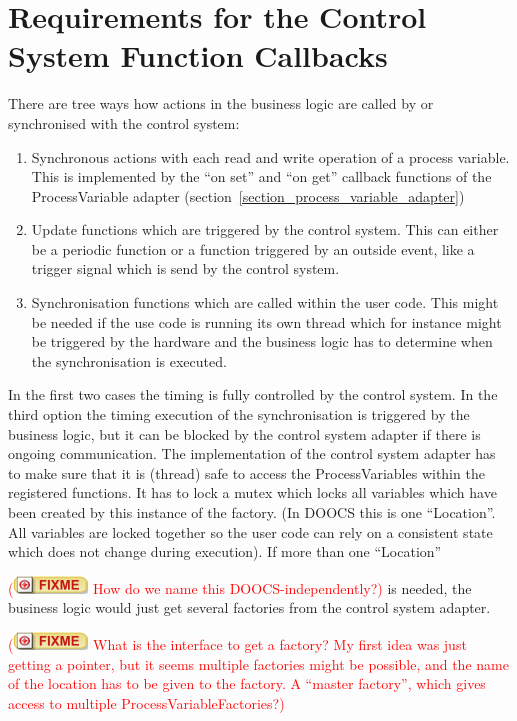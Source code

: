 \documentclass[11pt,a4paper]{scrartcl}
\newcounter{nFixmes}
\newcommand{\fixme}[1]{\addtocounter{nFixmes}{1}\textcolor{red}{(\includegraphics[height=2ex]{fixme} #1)}\xspace}
\begin{document}
\section{Requirements for the Control System Function Callbacks}
\label{section_function_callbacks}
There are tree ways how actions in the business logic are called by or
synchronised with the control system:
\begin{enumerate}
  \item Synchronous actions with each read and write operation of a 
    process variable. This is implemented by the ``on set'' and 
    ``on get'' callback functions of the ProcessVariable adapter
    (section~\ref{section_process_variable_adapter})
  \item Update functions which are triggered by the control system.
    This can either be a periodic function or a function triggered 
    by an outside event, like a trigger signal which is send by the
    control system.
  \item Synchronisation functions which are called within the user code.
    This might be needed if the use code is running its own thread which
    for instance might be triggered by the hardware and the business logic
    has to determine when the synchronisation is executed.
\end{enumerate}

In the first two cases the timing is fully controlled by the control system.
In the third option the timing execution of the synchronisation is triggered by
the business logic, but it can be blocked by the control system adapter if there is
ongoing communication. The
implementation of the control system adapter has to make sure that it is (thread)
safe to access the ProcessVariables within the registered functions. It has to lock 
a mutex which locks all variables which have been created by this instance of the factory.
(In DOOCS this is one ``Location''. All variables are locked together so the user code
can rely on a consistent state which does not change during execution).
If more than one ``Location'' \fixme{How do we name this DOOCS-independently?} is needed,
the business logic would just get several factories from the control system adapter.

\fixme{What is the interface to get a factory? My first idea was just getting a pointer, but it
seems multiple factories might be possible, and the name of the location has to be given to the
factory. A ``master factory'', which gives access to multiple ProcessVariableFactories?}
\end{document}
